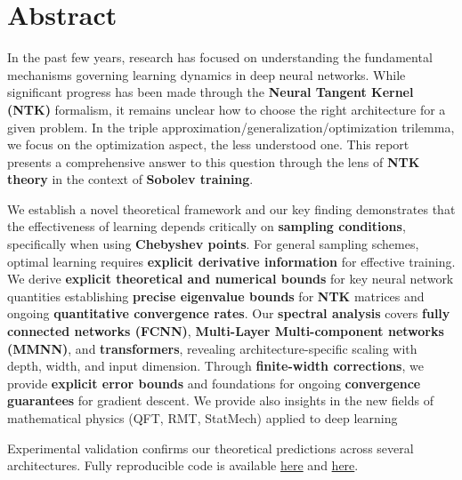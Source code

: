 \documentclass[a4paper]{article}
\theoremstyle{plain}
\theoremstyle{definition}
\theoremstyle{remark}
\begin{document}
\newpage
\tableofcontents
\newpage








\section*{Abstract}

In the past few years, research has focused on understanding the fundamental mechanisms governing learning dynamics in deep neural networks. While significant progress has been made through the \textbf{Neural Tangent Kernel (NTK)} formalism, it remains unclear how
to choose the right architecture for a given problem. In the triple approximation/generalization/optimization trilemma, we focus on the optimization aspect, the less understood one.
This report presents a comprehensive answer to this question through the lens of \textbf{NTK theory} in the context of
\textbf{Sobolev training}.

We establish a novel theoretical framework and our key finding demonstrates that the effectiveness of learning depends critically on \textbf{sampling conditions}, specifically when using \textbf{Chebyshev points}.
For general sampling schemes, optimal learning requires \textbf{explicit derivative information} for effective training. We derive \textbf{explicit theoretical and numerical bounds} for key neural network quantities establishing \textbf{precise eigenvalue bounds} for \textbf{NTK} matrices and ongoing \textbf{quantitative convergence rates}. Our \textbf{spectral analysis} covers \textbf{fully connected networks (FCNN)}, \textbf{Multi-Layer Multi-component networks (MMNN)}, and \textbf{transformers}, revealing architecture-specific scaling with depth, width, and input dimension. 
Through \textbf{finite-width corrections}, we provide \textbf{explicit error bounds} and foundations for ongoing \textbf{convergence guarantees} for gradient descent. We provide also insights in the
new fields of mathematical physics (QFT, RMT, StatMech) applied to deep learning

Experimental validation confirms our theoretical predictions across several architectures. Fully reproducible code is available \href{https://github.com/janisaiad/DeNN-NTK}{here} and \href{https://github.com/janisaiad/MMN}{here}.




\vspace{0.5cm}
\end{document}
